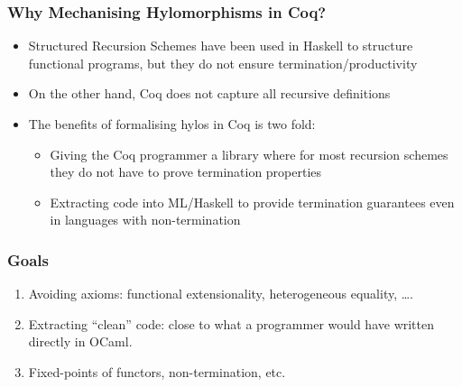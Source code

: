 \begin{frame}
  \frametitle{Why Mechanising Hylomorphisms in Coq?}

  \begin{itemize}
    \item Structured Recursion Schemes have been used in Haskell to structure
      functional programs, but they do not ensure termination/productivity
    \item On the other hand, Coq does not capture all recursive definitions
    \item The benefits of formalising hylos in Coq is two fold:
      \begin{itemize}
        \item Giving the Coq programmer a library where for most recursion
          schemes they do not have to prove termination properties
        \item Extracting code into ML/Haskell to provide termination guarantees
          even in languages with non-termination
      \end{itemize}
  \end{itemize}
\end{frame}

\begin{frame}
  \frametitle{Goals}
  \begin{enumerate}
    \item Avoiding axioms: functional extensionality, heterogeneous equality,
      \ldots.
    \item Extracting ``clean'' code: close to what a programmer would have
      written directly in OCaml.
    \item Fixed-points of functors, non-termination, etc.
  \end{enumerate}

  \vspace{.5cm}
  
\end{frame}


